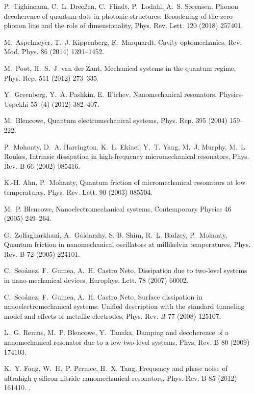 \documentclass[3p,sort&compress,12pt]{elsarticle}
\begin{document}
\begin{thebibliography}{100}
P.~Tighineanu, C.~L. Dree\ss{}en, C.~Flindt, P.~Lodahl, A.~S. S\o{}rensen,
  Phonon decoherence of quantum dots in photonic structures: Broadening of the
  zero-phonon line and the role of dimensionality, Phys. Rev. Lett. 120 (2018)
  257401.

M.~Aspelmeyer, T.~J. Kippenberg, F.~Marquardt, Cavity optomechanics, Rev. Mod.
  Phys. 86 (2014) 1391--1452.

M.~Poot, H.~S.~J. {van der Zant}, Mechanical systems in the quantum regime,
  Phys. Rep. 511 (2012) 273--335.

Y.~Greenberg, Y.~A. Pashkin, E.~Il{'}ichev, Nanomechanical resonators,
  Physics-Uspekhi 55~(4) (2012) 382--407.

M.~Blencowe, Quantum electromechanical systems, Phys. Rep. 395 (2004) 159--222.

P.~Mohanty, D.~A. Harrington, K.~L. Ekinci, Y.~T. Yang, M.~J. Murphy, M.~L.
  Roukes, Intrinsic dissipation in high-frequency micromechanical resonators,
  Phys. Rev. B 66 (2002) 085416.

K.-H. Ahn, P.~Mohanty, Quantum friction of micromechanical resonators at low
  temperatures, Phys. Rev. Lett. 90 (2003) 085504.

M.~P. Blencowe, Nanoelectromechanical systems, Contemporary Physics 46 (2005)
  249--264.

G.~Zolfagharkhani, A.~Gaidarzhy, S.-B. Shim, R.~L. Badzey, P.~Mohanty, Quantum
  friction in nanomechanical oscillators at millikelvin temperatures, Phys.
  Rev. B 72 (2005) 224101.

C.~Seo{\'a}nez, F.~Guinea, A.~H. {Castro Neto}, Dissipation due to two-level
  systems in nano-mechanical devices, Europhys. Lett. 78 (2007) 60002.

C.~Seo{\'a}nez, F.~Guinea, A.~H. {Castro Neto}, Surface dissipation in
  nanoelectromechanical systems: {U}nified description with the standard
  tunneling model and effects of metallic electrodes, Phys. Rev. B 77 (2008)
  125107.

L.~G. Remus, M.~P. Blencowe, Y.~Tanaka, Damping and decoherence of a
  nanomechanical resonator due to a few two-level systems, Phys. Rev. B 80
  (2009) 174103.

K.~Y. Fong, W.~H.~P. Pernice, H.~X. Tang, Frequency and phase noise of
  ultrahigh $q$ silicon nitride nanomechanical resonators, Phys. Rev. B 85
  (2012) 161410.
\newblock \href {http://dx.doi.org/10.1103/PhysRevB.85.161410}
  {}.


\end{thebibliography}
\end{document}
